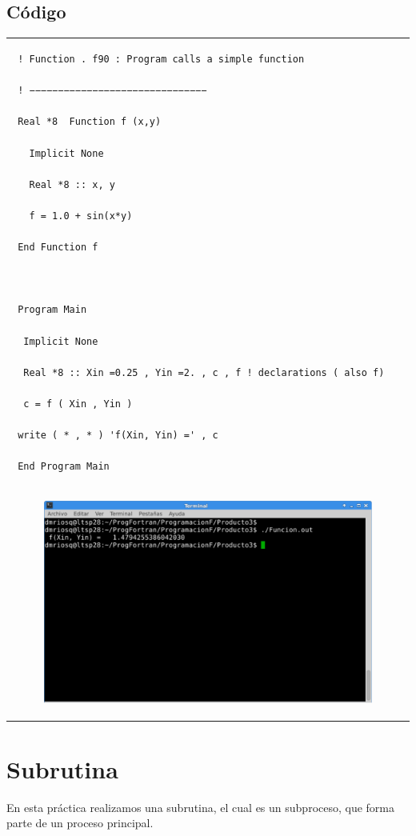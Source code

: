 \documentclass[10pt]{article}
\begin{document}
\subsection{Código}
\begin{tabular}{l}
\begin{verbatim}  
 ! Function . f90 : Program calls a simple function

 ! −−−−−−−−−−−−−−−−−−−−−−−−−−−−−−−

 Real *8  Function f (x,y)

   Implicit None

   Real *8 :: x, y

   f = 1.0 + sin(x*y)

 End Function f



 Program Main

  Implicit None

  Real *8 :: Xin =0.25 , Yin =2. , c , f ! declarations ( also f)

  c = f ( Xin , Yin )

 write ( * , * ) 'f(Xin, Yin) =' , c

 End Program Main 
\end{verbatim} \\
\begin{figure}
  \centering
    \includegraphics[scale=0.4]{F}
\end{figure}
\end{tabular}





\section{Subrutina}
En esta práctica realizamos una subrutina, el cual es un subproceso, que forma parte de un proceso principal.
\end{document}
